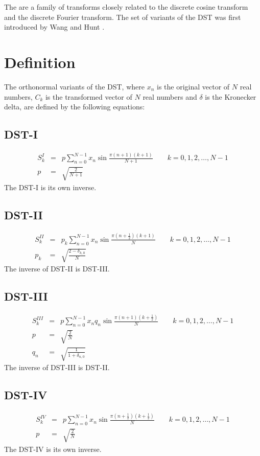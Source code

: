 \documentclass[12pt]{article}
\begin{document}
The  are a family of  transforms closely related to the discrete cosine transform and the discrete Fourier transform. The  set of variants of the DST was first introduced by Wang and Hunt \cite{DWT}.

\section{Definition}

The orthonormal variants of the DST, where $x_n$ is the original vector of $N$ real numbers, $C_k$ is the transformed vector of $N$ real numbers and $\delta$ is the Kronecker delta, are defined by the following equations:

\subsection{DST-I}
\begin{eqnarray*}
S^{I}_k&=&p \sum _{n=0}^{N-1} x_n \sin \frac{\pi (n+1) (k+1)}{N+1} \quad \quad k=0, 1, 2, \dots, N-1\\
p&=&\sqrt{\frac{2}{N+1}}
\end{eqnarray*}
The DST-I is its own inverse.

\subsection{DST-II}
\begin{eqnarray*}
S^{II}_k&=&p_k \sum _{n=0}^{N-1} x_n \sin \frac{\pi \left(n+\frac{1}{2}\right) (k+1)}{N} \quad \quad k=0, 1, 2, \dots, N-1\\
p_k&=&\sqrt{\frac{2-\delta _{k,0}}{N}}
\end{eqnarray*}
The inverse of DST-II is DST-III.

\subsection{DST-III}
\begin{eqnarray*}
S^{III}_k&=&p \sum _{n=0}^{N-1} x_n q_n \sin \frac{\pi (n+1) \left(k+\frac{1}{2}\right)}{N} \quad \quad k=0, 1, 2, \dots, N-1\\
p&=&\sqrt{\frac{2}{N}}\\
q_n&=&\sqrt{\frac{1}{1+\delta _{n,0}}}
\end{eqnarray*}
The inverse of DST-III is DST-II.

\subsection{DST-IV}
\begin{eqnarray*}
S^{IV}_k&=&p \sum _{n=0}^{N-1} x_n \sin \frac{\pi \left(n+\frac{1}{2}\right) \left(k+\frac{1}{2}\right)}{N} \quad \quad k=0, 1, 2, \dots, N-1\\
p&=&\sqrt{\frac{2}{N}}
\end{eqnarray*}
The DST-IV is its own inverse.
\end{document}
